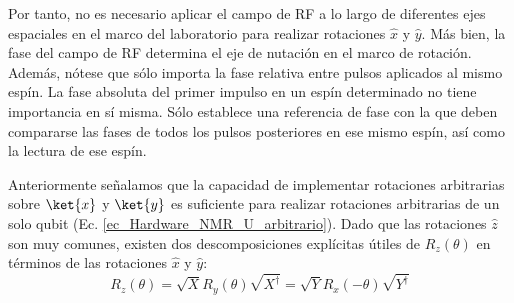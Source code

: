 Por tanto, no es necesario aplicar el campo de RF a lo largo de diferentes ejes espaciales en el marco del laboratorio para realizar rotaciones $\hat{x}$ y $\hat{y}$. Más bien, la fase del campo de RF determina el eje de nutación en el marco de rotación. Además, nótese que sólo importa la fase relativa entre pulsos aplicados al mismo espín. La fase absoluta del primer impulso en un espín determinado no tiene importancia en sí misma. Sólo establece una referencia de fase con la que deben compararse las fases de todos los pulsos posteriores en ese mismo espín, así como la lectura de ese espín.

Anteriormente señalamos que la capacidad de implementar rotaciones arbitrarias sobre $\ket{x}$ y $\ket{y}$ es suficiente para realizar rotaciones arbitrarias de un solo qubit (Ec. \ref{ec_Hardware_NMR_U_arbitrario}). Dado que las rotaciones $\hat{z}$ son muy comunes, existen dos descomposiciones explícitas útiles de $R_z(\theta)$ en términos de las rotaciones $\hat{x}$ y $\hat{y}$:
	\begin{equation}
	R_z (\theta) = \sqrt{X} R_y (\theta) \sqrt{X^\dagger} = \sqrt{Y} R_x(-\theta) \sqrt{Y^\dagger}
	\end{equation}



